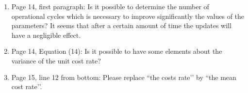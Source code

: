 \documentclass[authoryear]{elsarticle}
\begin{document}
\begin{enumerate}
\item Page 14, first paragraph: Is it possible to determine the number of operational cycles which is necessary to improve significantly the values of the parameters? It seems that after a certain amount of time the updates will have a negligible effect. 

\item Page 14, Equation (14): Is it possible to have some elements about the variance of the unit cost rate?

\item Page 15, line 12 from bottom: Please replace ``the costs rate’’ by ``the mean cost rate’’.

\end{enumerate}
\end{document}

